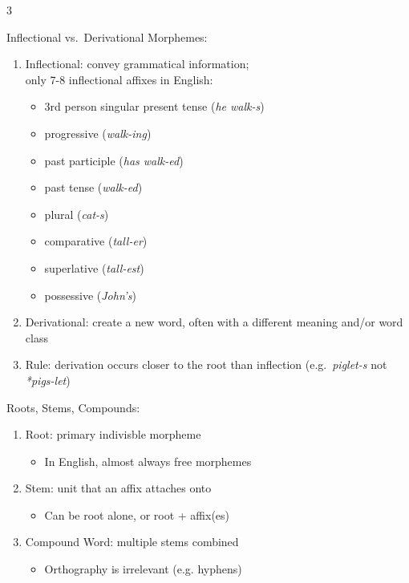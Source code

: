 \documentclass[12pt, a4paper]{article}
\begin{document}
\begin{multicols*}{3}
\begin{enumerate}[\roman*.]
\begin{itemize}[leftmargin=*]
    \end{itemize}
\end{enumerate}

Inflectional vs.\ Derivational Morphemes:
\begin{enumerate}[\roman*.]
  \item Inflectional: convey grammatical information;\\only 7-8 inflectional affixes in English:
    \begin{itemize}[leftmargin=*]\vspace{3pt}
      \item 3rd person singular present tense (\textit{he walk-s}) 
      \item progressive (\textit{walk-ing}) 
      \item past participle (\textit{has walk-ed}) 
      \item past tense (\textit{walk-ed}) 
      \item plural (\textit{cat-s})
      \item comparative (\textit{tall-er}) 
      \item superlative (\textit{tall-est}) 
      \item possessive (\textit{John's})
    \end{itemize}
  \item Derivational: create a new word, often with a different meaning and/or word class
  \item Rule: derivation occurs closer to the root than inflection (e.g.\ \textit{piglet-s} not \textit{*pigs-let})
\end{enumerate}

\colbreak
Roots, Stems, Compounds:
\begin{enumerate}[\roman*.]
  \item Root: primary indivisble morpheme 
    \begin{itemize}[leftmargin=*]\vspace{3pt}
      \item In English, almost always free morphemes
    \end{itemize}
  \item Stem: unit that an affix attaches onto 
    \begin{itemize}[leftmargin=*]\vspace{3pt}
      \item Can be root alone, or root + affix(es)
    \end{itemize}
  \item Compound Word: multiple stems combined 
    \begin{itemize}[leftmargin=*]\vspace{3pt}
      \item Orthography is irrelevant (e.g. hyphens)
    \end{itemize}
\end{enumerate}


\end{multicols*}
\end{document}
